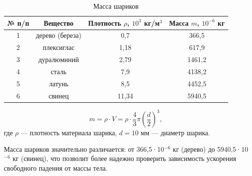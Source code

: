\documentclass[a4paper,14pt]{extarticle}
\theoremstyle{plain}
\theoremstyle{remark}
\theoremstyle{definition}
\begin{document}
\begin{table}[H]
\centering
\caption{Масса шариков}
\label{tabl:1}
\begin{tabular}{|c|c|c|c|}
\hline
№ п/п & Вещество & Плотность $\rho$, $10^3$ кг/м$^3$ & Масса $m$, $10^{-6}$ кг \\
\hline
1 & дерево (береза) & 0,7 & 366,5 \\
\hline
2 & плексиглас & 1,18 & 617,9 \\
\hline
3 & дуралюминий & 2,79 & 1461,2 \\
\hline
4 & сталь & 7,9 & 4138,2 \\
\hline
5 & латунь & 8,5 & 4452,5 \\
\hline
6 & свинец & 11,34 & 5940,5 \\
\hline
\end{tabular}
\end{table}
\begin{equation}
m = \rho \cdot V = \rho \cdot \frac{4}{3}\pi \left(\frac{d}{2}\right)^3, \tag{2}
\end{equation}
где $\rho$ — плотность материала шарика, $d = 10$ мм — диаметр шарика.

Масса шариков значительно различается: от 366,5·10$^{-6}$ кг (дерево) до 5940,5·10$^{-6}$ кг (свинец), что позволит более надежно проверить зависимость ускорения свободного падения от массы тела.
\end{document}
